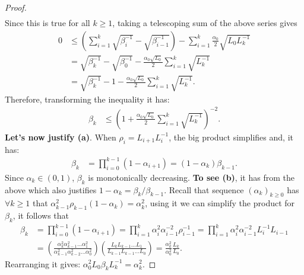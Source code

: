\documentclass[12pt]{report}
\begin{document}
\begin{proof}
\begin{align*}
            \end{align*}
            Since this is true for all $k \ge 1$, taking a telescoping sum of the above series gives
            \begin{align*}
                0 &\le 
                \left(
                    \sum_{i = 1}^{k} \sqrt{\beta_i^{-1}} - \sqrt{\beta_{i - 1}^{-1}}
                \right)
                - \sum_{i = 1}^{k} \frac{\alpha_0}{2} \sqrt{L_0L_k^{-1}}
                \\
                &= 
                \sqrt{\beta_k^{-1}} - \sqrt{\beta_0^{-1}} 
                - \frac{\alpha_0\sqrt{L_0}}{2}\sum_{i = 1}^{k} \sqrt{ L_k^{-1}}
                \\
                &= 
                \sqrt{\beta_k^{-1}} - 1
                - \frac{\alpha_0\sqrt{L_0}}{2}\sum_{i = 1}^{k} \sqrt{ L_k^{-1}}. 
            \end{align*}
            Therefore, transforming the inequality it has: 
            \begin{align*}
                \beta_k &\le 
                \left(
                    1 + \frac{\alpha_0\sqrt{L_0}}{2}\sum_{i = 1}^{k} \sqrt{ L_k^{-1}}
                \right)^{-2}. 
            \end{align*}
            \textbf{Let's now justify (a)}.
            When $\rho_{i} = L_{i + 1}L_i^{-1}$, the big product simplifies and, it has: 
            \begin{align*}
                \beta_k &= \prod_{i = 0}^{k - 1}(1 - \alpha_{i + 1}) 
                = (1 - \alpha_k)\beta_{k - 1}. 
            \end{align*}
            Since $\alpha_k \in (0, 1)$, $\beta_k$ is monotonically decreasing. 
            \textbf{To see (b)}, it has from the above which also justifies $1 - \alpha_k = \beta_k / \beta_{k - 1}$. 
            Recall that sequence $(\alpha_k)_{k \ge 0}$ has $\forall k \ge 1$ that $\alpha_{k - 1}^2\rho_{k - 1}(1 - \alpha_k) = \alpha_k^2$, using it we can simplify the product for $\beta_k$, it follows that 
            \begin{align*}
                \beta_k &= \prod_{i = 0}^{k - 1}\left(
                    1 - \alpha_{i + 1}
                \right)
                = 
                \prod_{i = 1}^{k}\alpha_i^2\alpha_{i - 1}^{-2}\rho_{i - 1}^{-1}
                = 
                \prod_{i = 1}^{k}\alpha_i^2\alpha_{i - 1}^{-2} L_i^{-1}L_{i - 1}
                \\
                &= \left(
                    \frac{\alpha_k^2\alpha_{k - 1}^2\ldots \alpha_1^2}
                    {\alpha_{k -1}^2\alpha_{k - 2}^2\ldots \alpha_0^2}
                \right)\left(
                    \frac{L_kL_{k - 1}\ldots L_1}{L_{k - 1}L_{k - 1}\ldots L_0}
                \right)
                = \frac{\alpha_k^2}{\alpha_0^2}\frac{L_k}{L_0}. 
            \end{align*}
            Rearranging it gives: $\alpha_0^2L_0 \beta_kL_k^{-1} = \alpha_k^2$.
        \end{proof}
\end{document}

